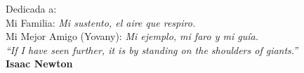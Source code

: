 \begin{titlepage}
 \vspace*{\fill}
 \begin{center}
{\Large Dedicada a:}\\
{\Large {\sc Mi Familia}}: \textit{\footnotesize Mi sustento, el aire que respiro.}\\
{\Large {\sc Mi Mejor Amigo}} (Yovany): \textit{\footnotesize Mi ejemplo, mi faro y mi guía.} 
\\[1.5cm]
\textit{``If I have seen further, it is by standing on the shoulders of giants.''}\\
\hspace{8.7cm}\textbf{Isaac Newton}\\
 \end{center}
 \vspace*{\fill}
\end{titlepage}
